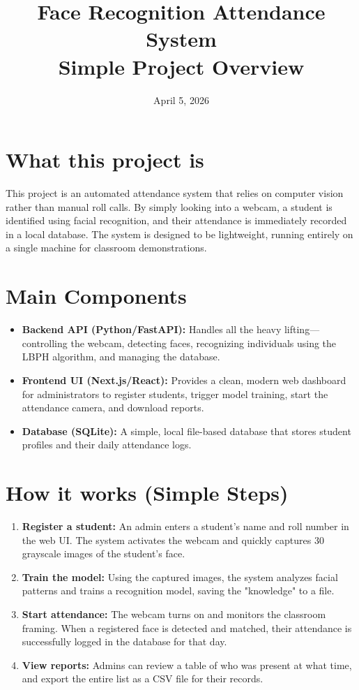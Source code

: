 \documentclass[12pt]{article}
\title{\textbf{Face Recognition Attendance System}\\\Large Simple Project Overview}
\author{}
\date{April 5, 2026}
\begin{document}
\maketitle

\section*{What this project is}
This project is an automated attendance system that relies on computer vision rather than manual roll calls. By simply looking into a webcam, a student is identified using facial recognition, and their attendance is immediately recorded in a local database. The system is designed to be lightweight, running entirely on a single machine for classroom demonstrations.

\section*{Main Components}
\begin{itemize}[leftmargin=*]
  \item \textbf{Backend API (Python/FastAPI):} Handles all the heavy lifting—controlling the webcam, detecting faces, recognizing individuals using the LBPH algorithm, and managing the database.
  \item \textbf{Frontend UI (Next.js/React):} Provides a clean, modern web dashboard for administrators to register students, trigger model training, start the attendance camera, and download reports.
  \item \textbf{Database (SQLite):} A simple, local file-based database that stores student profiles and their daily attendance logs.
\end{itemize}

\section*{How it works (Simple Steps)}
\begin{enumerate}[leftmargin=*]
  \item \textbf{Register a student:} An admin enters a student's name and roll number in the web UI. The system activates the webcam and quickly captures 30 grayscale images of the student's face.
  \item \textbf{Train the model:} Using the captured images, the system analyzes facial patterns and trains a recognition model, saving the "knowledge" to a file.
  \item \textbf{Start attendance:} The webcam turns on and monitors the classroom framing. When a registered face is detected and matched, their attendance is successfully logged in the database for that day.
  \item \textbf{View reports:} Admins can review a table of who was present at what time, and export the entire list as a CSV file for their records.
\end{enumerate}
\end{document}
